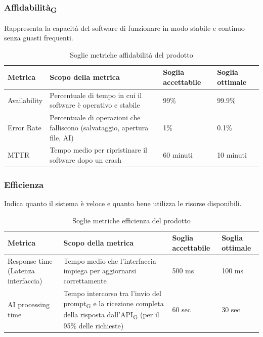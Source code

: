 \documentclass[11pt,a4paper]{article}
\newcommand{\gls}[1]{#1\textsubscript{G}}
\begin{document}
\subsubsection{Affidabilità\textsubscript{G}}
Rappresenta la capacità del software di funzionare in modo stabile e continuo senza guasti frequenti.
\begin{table}[H]
\centering
\renewcommand{\arraystretch}{1.5}
\begin{tabular}{|M{0.25\textwidth}|M{0.35\textwidth}|M{0.15\textwidth}|M{0.15\textwidth}|}
\hline
\textbf{Metrica} & \textbf{Scopo della metrica} & \textbf{Soglia accettabile} & \textbf{Soglia ottimale} \\
\hline
Availability & Percentuale di tempo in cui il software è operativo e stabile & 99\% & 99.9\% \\ \hline
Error Rate & Percentuale di operazioni che falliscono (salvataggio, apertura file, AI) & 1\% & 0.1\% \\ \hline
MTTR & Tempo medio per ripristinare il software dopo un crash & 60 minuti & 10 minuti \\
\hline
\end{tabular}
\caption{Soglie metriche affidabilità del prodotto}
\end{table}

\subsubsection{Efficienza}
Indica quanto il sistema è veloce e quanto bene utilizza le risorse disponibili.
\begin{table}[H]
\centering
\renewcommand{\arraystretch}{1.5}
\begin{tabular}{|M{0.25\textwidth}|M{0.35\textwidth}|M{0.15\textwidth}|M{0.15\textwidth}|}
\hline
\textbf{Metrica} & \textbf{Scopo della metrica} & \textbf{Soglia accettabile} & \textbf{Soglia ottimale} \\
\hline
Response time (Latenza interfaccia) & Tempo medio che l'interfaccia impiega per aggiornarsi correttamente & 500 ms & 100 ms \\ \hline
AI processing time & Tempo intercorso tra l'invio del \gls{prompt} e la ricezione completa della risposta dall'\gls{API} (per il 95\% delle richieste) & 60 sec  & 30 sec \\
\hline
\end{tabular}
\caption{Soglie metriche efficienza del prodotto}
\end{table}
\end{document}
